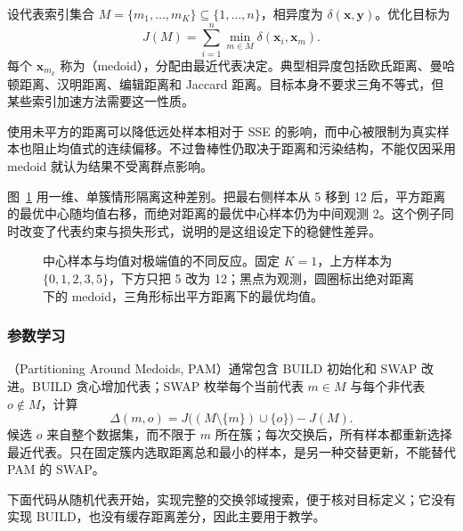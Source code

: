 设代表索引集合 $M=\{m_1,\ldots,m_K\}\subseteq\{1,\ldots,n\}$，相异度为 $\delta(\bm{x},\bm{y})$。优化目标为
\begin{equation}
 J(M)=\sum_{i=1}^n\min_{m\in M}\delta(\bm{x}_i,\bm{x}_m).
 \label{eq:clustering-medoids}
\end{equation}
每个 $\bm{x}_{m_k}$ 称为（medoid），分配由最近代表决定。典型相异度包括欧氏距离、曼哈顿距离、汉明距离、编辑距离和 Jaccard 距离。目标本身不要求三角不等式，但某些索引加速方法需要这一性质。

使用未平方的距离可以降低远处样本相对于 SSE 的影响，而中心被限制为真实样本也阻止均值式的连续偏移。不过鲁棒性仍取决于距离和污染结构，不能仅因采用 medoid 就认为结果不受离群点影响。

图~\ref{fig:clustering-medoid-robustness} 用一维、单簇情形隔离这种差别。把最右侧样本从 5 移到 12 后，平方距离的最优中心随均值右移，而绝对距离的最优中心样本仍为中间观测 2。这个例子同时改变了代表约束与损失形式，说明的是这组设定下的稳健性差异。

\Needspace{75mm}
\begin{figure}[htbp]
 \centering
 
 \caption{中心样本与均值对极端值的不同反应。固定 $K=1$，上方样本为 $\{0,1,2,3,5\}$，下方只把 5 改为 12；黑点为观测，圆圈标出绝对距离下的 medoid，三角形标出平方距离下的最优均值。}
 \label{fig:clustering-medoid-robustness}
\end{figure}

\subsubsection{参数学习}

（Partitioning Around Medoids, PAM）通常包含 BUILD 初始化和 SWAP 改进。BUILD 贪心增加代表；SWAP 枚举每个当前代表 $m\in M$ 与每个非代表 $o\notin M$，计算
\[
 \Delta(m,o)=
 J\bigl((M\setminus\{m\})\cup\{o\}\bigr)-J(M).
\]
候选 $o$ 来自整个数据集，而不限于 $m$ 所在簇；每次交换后，所有样本都重新选择最近代表。只在固定簇内选取距离总和最小的样本，是另一种交替更新，不能替代 PAM 的 SWAP。

下面代码从随机代表开始，实现完整的交换邻域搜索，便于核对目标定义；它没有实现 BUILD，也没有缓存距离差分，因此主要用于教学。

